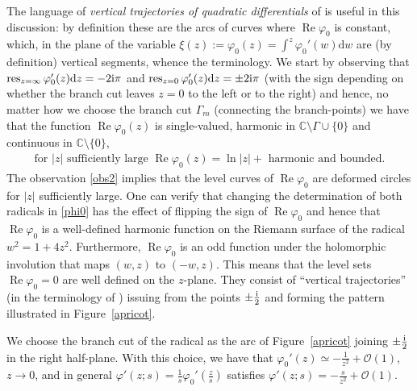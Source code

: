 \documentclass[10pt,a4paper]{amsart}
\numberwithin{equation}{section}
\theoremstyle{definition}
\def\le{\left}
\def\ri{\right}
\def \d{{\mathrm d}}
\def\res{\mathop{\mathrm {res}}}
\def\C{{\mathbb C}}
\def \Re{\operatorname{Re} }
\begin{document}
The language of {\it vertical trajectories of quadratic differentials} of \cite{Strebel} is useful in this discussion: by definition these are the arcs of curves where $\Re \varphi_0$ is constant, which, in the plane of the variable $\xi(z):= \varphi_0(z) = \int^z \varphi_0'(w)\d w$ are (by definition) vertical segments, whence the terminology.
We start by observing that $\res_{z=\infty} \varphi'_0(z)\d z=-2{\rm i}\pi$ and $\res_{z=0}\varphi'_0(z)\d z = \pm 2{\rm i}\pi $ (with the sign depending on whether the branch cut leaves $z=0$ to the left or to the right) and hence, no matter how we choose the branch cut $\Gamma_m$ (connecting the branch-points) we have that
the function $\Re \varphi_0(z)$ is single-valued, harmonic in $\C\setminus \Gamma\cup\{0\}$ and continuous in $\C \setminus \{0\}$,
\begin{gather}
\label{obs2}
\text{for $|z|$ sufficiently large $\Re \varphi_0(z) = \ln |z| + $ harmonic and bounded.}
\end{gather}
 The observation \eqref{obs2} implies that the level curves of $\Re \varphi_0$ are deformed circles for $|z|$ sufficiently large.
 One can verify that changing the determination of both radicals in \eqref{phi0} has the effect of flipping the sign of $\Re\varphi_0$ and hence that $\Re \varphi_0$ is a well-defined harmonic function on the Riemann surface of the radical
 $
 w^2= {1 + 4z^2}$.
 Furthermore, $\Re \varphi_0$ is an odd function under the holomorphic involution that maps $(w,z)$ to $(-w,z)$.
 This means that the level sets $\Re \varphi_0=0$ are well defined on the $z$-plane. They consist of ``vertical trajectories'' (in the terminology of \cite{Strebel}) issuing from the points $\pm \frac {\rm i}2$ and forming the pattern illustrated in Figure~\ref{apricot}.

We choose the branch cut of the radical as the arc of Figure~\ref{apricot} joining $\pm \frac {\rm i}2 $ in the right half-plane.
With this choice, we have that
$\varphi_0'(z) \simeq - \frac 1 {z^2} + \mathcal O(1)$, $ z\to 0$,
and in general $\varphi'(z;s) = \frac 1 s \varphi_0'\le(\frac z s\ri)$ satisfies
$\varphi'(z;s) = -\frac s {z^2} + \mathcal O(1)$.
\end{document}
